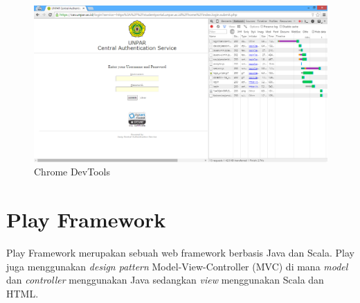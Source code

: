 \begin{figure}
	\centering
	\includegraphics[scale=0.5]{Gambar/chrome-devtools}
	\caption{Chrome DevTools} 
	\label{fig:chrome_devtools}
\end{figure}

\section{Play Framework}
\label{sec:play}

Play Framework \cite{Leroux:2014} merupakan sebuah web framework berbasis Java dan Scala. Play juga menggunakan \textit{design pattern} Model-View-Controller (MVC) di mana \textit{model} dan \textit{controller} menggunakan Java sedangkan \textit{view} menggunakan Scala dan HTML. 
